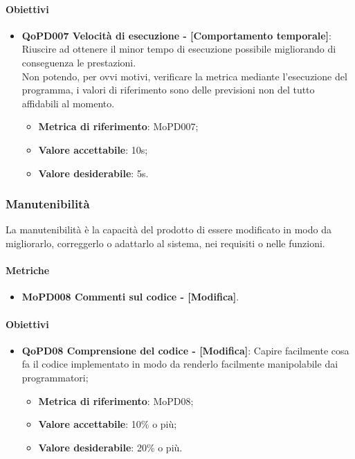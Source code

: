 \documentclass[../piano-di-qualifica.tex]{subfiles}
\begin{document}
\paragraph{Obiettivi}
\label{sub:obiettivi}
\begin{itemize}
    \item \textbf{QoPD007 Velocità di esecuzione - [Comportamento temporale]}: Riuscire ad ottenere il minor tempo di esecuzione possibile migliorando di conseguenza le prestazioni.
    \\ Non potendo, per ovvi motivi, verificare la metrica mediante l'esecuzione del programma, i valori di riferimento sono delle previsioni non del tutto affidabili al momento.
        \begin{itemize}
            \item \textbf{Metrica di riferimento}: MoPD007;
            \item \textbf{Valore accettabile}: 10s;
            \item \textbf{Valore desiderabile}: 5s.
        \end{itemize}
\end{itemize}

\subsubsection{Manutenibilità}%
\label{sub:manutenibilita}
La manutenibilità è la capacità del prodotto di essere modificato in modo da migliorarlo, correggerlo o adattarlo al sistema, nei requisiti o nelle funzioni.

\paragraph{Metriche}
\label{sub:metriche}
\begin{itemize}
    \item \textbf{MoPD008 Commenti sul codice - [Modifica]}.
\end{itemize}

\paragraph{Obiettivi}
\label{sub:obiettivi}
\begin{itemize}
    \item \textbf{QoPD08 Comprensione del codice - [Modifica]}: Capire facilmente cosa fa il codice implementato in modo da renderlo facilmente manipolabile dai programmatori;
        \begin{itemize}
            \item \textbf{Metrica di riferimento}: MoPD08;
            \item \textbf{Valore accettabile}: 10\% o più;
            \item \textbf{Valore desiderabile}: 20\% o più.
        \end{itemize}
\end{itemize}
\end{document}
